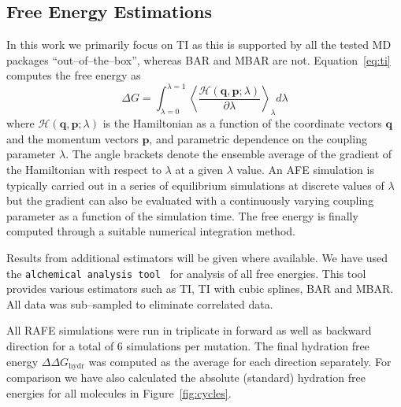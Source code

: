 \documentclass[journal=jctcce,manuscript=article]{achemso}
\newcommand{\progname}[1]{\texttt{#1}}
\renewcommand{\vec}[1]{\mathbf{#1}}
\begin{document}
\subsection{Free Energy Estimations}
\label{sec:analysis}

In this work we primarily focus on TI as this is supported by all the tested MD packages ``out--of--the--box'', whereas BAR and MBAR are not.
Equation~\ref{eq:ti} computes the free energy as
\begin{equation}\label{eq:ti}
	\Delta G = \int_{\lambda=0}^{\lambda=1}
	\left\langle
	\frac{\mathscr{H}(\vec{q},\vec{p};\lambda)}{\partial\lambda}\right\rangle_\lambda
	 d\lambda
\end{equation}
where $\mathscr{H}(\vec{q},\vec{p};\lambda)$ is the Hamiltonian as a function
of the coordinate vectors $\vec{q}$ and the momentum vectors $\vec{p}$, and
parametric dependence on the coupling parameter $\lambda$.  The angle brackets
denote the ensemble average of the gradient of the Hamiltonian with respect to
$\lambda$ at a given $\lambda$ value.  An AFE simulation is typically carried
out in a series of equilibrium simulations at discrete values of $\lambda$ but
the gradient can also be evaluated with a continuously varying coupling
parameter as a function of the simulation time.  The free energy is finally
computed through a suitable numerical integration method.

Results from additional estimators will be given where available.  We have used
the \progname{alchemical analysis
  tool}~\cite{klimovich_guidelines_2015} for analysis of
all free energies.  This tool provides various estimators such as TI, TI with
cubic splines, BAR and MBAR.  All data was sub--sampled to eliminate correlated
data.

All RAFE simulations were run in triplicate in forward as well as
backward direction for a total of 6 simulations per mutation.  The
final hydration free energy $\Delta\Delta G_{\mathrm{hydr}}$ was
computed as the average for each direction separately.  For comparison we have also calculated the absolute (standard) hydration free energies for all molecules in Figure~\ref{fig:cycles}.
\end{document}

